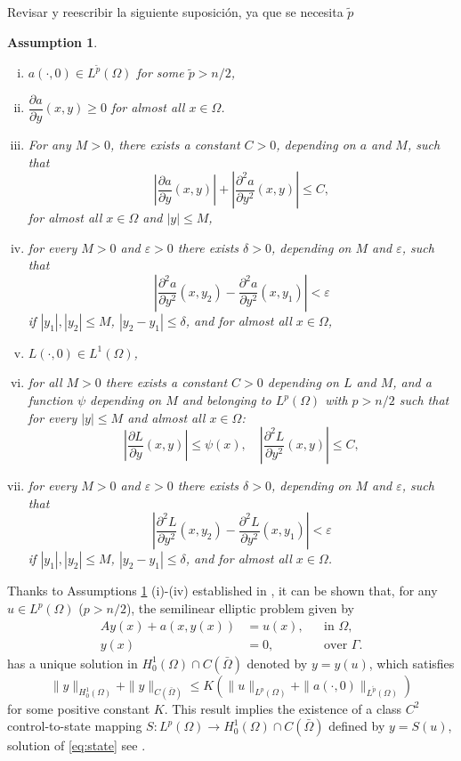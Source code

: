 \documentclass[11pt,a4paper]{amsart}
\renewcommand{\l}{\left}
\renewcommand{\r}{\right}
\newcommand{\om}{\Omega}
\newcounter{theassumption}
\newtheorem{assumption}[theassumption]{{Assumption}}
\begin{document}
{\color{red} Revisar y reescribir la siguiente suposición, ya que se necesita $\tilde p$}
\begin{assumption}\label{as:nonlinearities_regularity}
 \begin{enumerate}[(i)]~
    \item $a(\cdot,0)\in L^{\tilde p}(\om)$ for some $\tilde p>n/2$,
    \item $\dfrac{\partial a}{\partial y}(x,y)\ge 0$ for almost all $x\in \om$.
    \item For any $M>0$, there exists a constant $C>0$, depending on $a$ and $M$, such that
    \[
    \l\lvert \frac{\partial a}{\partial y}(x,y) \r\rvert + \l\lvert \frac{\partial^2 a}{\partial y^2}(x,y) \r\rvert\le C,
    \]
    for almost all $x\in \om$ and $|y|\le M$,
    \item for every $M > 0$ and $\varepsilon > 0$ there exists $\delta > 0$, depending on $M$ and $\varepsilon$, such that
    \[
    \left| \frac{\partial^2 a}{\partial y^2}(x, y_2) - \frac{\partial^2 a}{\partial y^2}(x, y_1) \right| < \varepsilon 
    \]
    if $|y_1|, |y_2| \leq M$, $|y_2 - y_1| \leq \delta$, and for almost all $x \in \Omega$,
    \item $L(\cdot, 0)\in L^1(\om)$,
    \item for all $M>0$ there exists a constant $C>0$ depending on $L$ and $M$, and a function $\psi$ depending on $M$ and belonging to $L^{p}(\om)$ with $p>n/2$ such that for every $|y|\le M$ and almost all $x\in \om$:
    \[
    \l| \frac{\partial L}{\partial y}(x,y) \r|\le \psi(x),\quad \l|\frac{\partial^2 L}{\partial y^2}(x,y)\r|\le C,
    \]
    \item for every $M > 0$ and $\varepsilon > 0$ there exists $\delta > 0$, depending on $M$ and $\varepsilon$, such that
    \[
    \left| \frac{\partial^2 L}{\partial y^2}(x, y_2) - \frac{\partial^2 L}{\partial y^2}(x, y_1) \right| < \varepsilon 
    \]
    if $|y_1|, |y_2| \leq M$, $ |y_2 - y_1| \leq \delta$, and for almost all $x \in \Omega$.
\end{enumerate}   
\end{assumption}

 Thanks to Assumptions \ref{as:nonlinearities_regularity} (i)-(iv) established in \cite{CasasMateos2024}, it can be shown that, for any $u\in L^p(\om)$ ($p>n/2$), the semilinear elliptic problem given by
\begin{equation}\label{eq:state}
\begin{aligned}
    Ay(x) + a(x, y(x)) &= u(x), &&\text{in } \Omega, \\
    y(x) &= 0, &&\text{over } \Gamma.
\end{aligned}
\end{equation}
has a unique solution in $ H_0^{1}(\om)\cap C(\bar \om)$ denoted by $y=y(u)$, which satisfies
\begin{equation}\label{eq:y_boundedness}
    \|y\|_{H_0^1(\om)} + \|y\|_{C(\bar\om)} \leq K(\|u\|_{L^p(\om)} + \|a(\cdot,0)\|_{L^{\tilde p}(\om)})
\end{equation}
for some positive constant $K$. This result implies the existence of a class $C^2$ control-to-state mapping $S:L^p(\om)\to H_0^1(\om)\cap C(\bar\om)$ defined by $y=S(u)$, solution of \eqref{eq:state} see \cite{CasasMateos2024}.
\end{document}
